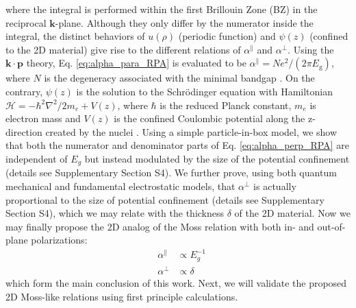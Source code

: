 \documentclass[journal=ancac3,manuscript=article,email=true,hyperref=true,keywords=false]{achemso}
\begin{document}
where the integral is performed within the first Brillouin Zone (BZ)
in the reciprocal $\mathbf{k}$-plane. Although they only differ by the
numerator inside the integral, the distinct behaviors of $u(\rho)$
(periodic function) and $\psi(z)$ (confined to the 2D material) give
rise to the different relations of $\alpha^{\parallel}$ and
$\alpha^{\perp}$. Using the $\mathbf{k} \cdot \mathbf{p}$ theory,
Eq. \ref{eq:alpha_para_RPA} is evaluated to be
$\alpha^{\parallel} = N e^{2}/(2\pi E_{\mathrm{g}})$, where $N$ is the
degeneracy associated with the minimal bandgap
\cite{Jiang_2017_Eg_Eb}. On the contrary, $\psi(z)$ is the solution to
the Schr\"{o}dinger equation with Hamiltonian
$\mathcal{H} = -\hbar^{2} \nabla^{2}/2m_{e} + V(z)$, where $\hbar$ is
the reduced Planck constant, $m_{e}$ is electron mass and $V(z)$ is
the confined Coulombic potential along the z-direction created by the
nuclei \cite{davies_physics_1997,ihn_semiconductor_2009}. Using a
simple particle-in-box model, we show that both the numerator and
denominator parts of Eq. \ref{eq:alpha_perp_RPA} are independent of
$E_{g}$ but instead modulated by the size of the potential confinement
(details see Supplementary Section S4). We further prove, using both
quantum mechanical and fundamental electrostatic models, that
$\alpha^{\perp}$ is actually proportional to the size of potential
confinement (details see Supplementary Section S4), which we may
relate with the thickness $\delta$ of the 2D material. Now we may
finally propose the 2D analog of the Moss relation with both in- and
out-of-plane polarizations:
\begin{subequations}
\begin{eqnarray}
\label{eq:2D-Moss-para}
  &\alpha^{\parallel} &\propto E_{g}^{-1} \\
  \label{eq:2D-Moss-perp}
  &\alpha^{\perp} & \propto \delta
\end{eqnarray}
\end{subequations}
which form the main conclusion of this work. Next, we will validate
the proposed 2D Moss-like relations using first principle
calculations.
\end{document}
